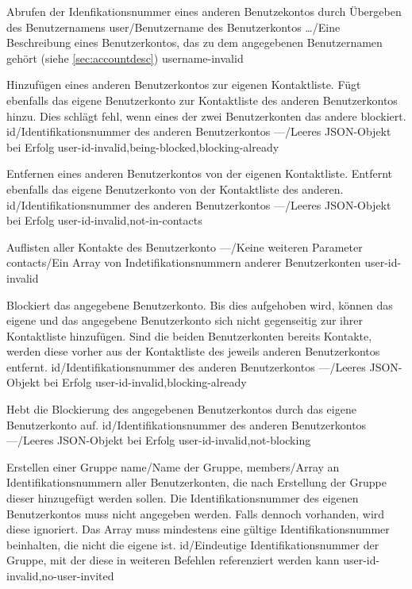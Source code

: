 \documentclass[parskip=full,11pt]{scrartcl}
\begin{document}
{Abrufen der Idenfikationsnummer eines anderen Benutzekontos durch Übergeben
des Benutzernamens}
{user/Benutzername des Benutzerkontos}
{\dots/Eine Beschreibung eines Benutzerkontos{,} das zu dem angegebenen
Benutzernamen gehört (siehe \ref{sec:accountdesc})}
{username-invalid}

{Hinzufügen eines anderen Benutzerkontos zur eigenen Kontaktliste.
Fügt ebenfalls das eigene Benutzerkonto zur Kontaktliste des anderen
Benutzerkontos hinzu.
Dies schlägt fehl, wenn eines der zwei Benutzerkonten das andere blockiert.}
{id/Identifikationsnummer des anderen Benutzerkontos}
{---/Leeres JSON-Objekt bei Erfolg}
{user-id-invalid,being-blocked,blocking-already}

{Entfernen eines anderen Benutzerkontos von der eigenen Kontaktliste.
Entfernt ebenfalls das eigene Benutzerkonto von der Kontaktliste des anderen.}
{id/Identifikationsnummer des anderen Benutzerkontos}
{---/Leeres JSON-Objekt bei Erfolg}
{user-id-invalid,not-in-contacts}

{Auflisten aller Kontakte des Benutzerkonto}
{---/Keine weiteren Parameter}
{contacts/Ein Array von Indetifikationsnummern anderer Benutzerkonten}
{user-id-invalid}

{Blockiert das angegebene Benutzerkonto.
Bis dies aufgehoben wird, können das eigene und das angegebene
Benutzerkonto sich nicht gegenseitig zur ihrer Kontaktliste hinzufügen.
Sind die beiden Benutzerkonten bereits Kontakte, werden diese vorher aus der
Kontaktliste des jeweils anderen Benutzerkontos entfernt.}
{id/Identifikationsnummer des anderen Benutzerkontos}
{---/Leeres JSON-Objekt bei Erfolg}
{user-id-invalid,blocking-already}

{Hebt die Blockierung des angegebenen Benutzerkontos durch das eigene
Benutzerkonto auf.}
{id/Identifikationsnummer des anderen Benutzerkontos}
{---/Leeres JSON-Objekt bei Erfolg}
{user-id-invalid,not-blocking}

{Erstellen einer Gruppe}
{name/Name der Gruppe,
members/Array an Identifikationsnummern aller Benutzerkonten{,} die nach
Erstellung der Gruppe dieser hinzugefügt werden sollen.
Die Identifikationsnummer des eigenen Benutzerkontos muss nicht angegeben
werden.
Falls dennoch vorhanden{,} wird diese ignoriert.
Das Array muss mindestens eine gültige Identifikationsnummer beinhalten{,} die
nicht die eigene ist.}
{id/Eindeutige Identifikationsnummer der Gruppe{,} mit der diese in
weiteren Befehlen referenziert werden kann}
{user-id-invalid,no-user-invited}
\end{document}
